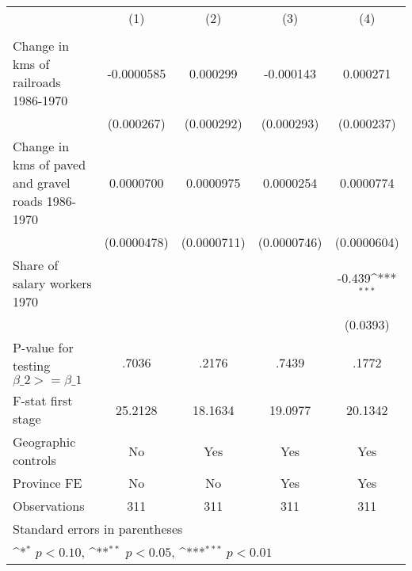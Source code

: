 {
\def\sym#1{\ifmmode^{#1}\else\(^{#1}\)\fi}
\begin{tabular}{l*{4}{c}}
\hline\hline
                &\multicolumn{1}{c}{(1)}&\multicolumn{1}{c}{(2)}&\multicolumn{1}{c}{(3)}&\multicolumn{1}{c}{(4)}\\
                &\multicolumn{1}{c}{}&\multicolumn{1}{c}{}&\multicolumn{1}{c}{}&\multicolumn{1}{c}{}\\
\hline
Change in kms of railroads 1986-1970&-0.0000585         & 0.000299         &-0.000143         & 0.000271         \\
                &(0.000267)         &(0.000292)         &(0.000293)         &(0.000237)         \\
[1em]
Change in kms of paved and gravel roads 1986-1970&0.0000700         &0.0000975         &0.0000254         &0.0000774         \\
                &(0.0000478)         &(0.0000711)         &(0.0000746)         &(0.0000604)         \\
[1em]
Share of salary workers 1970&                  &                  &                  &   -0.439\sym{***}\\
                &                  &                  &                  & (0.0393)         \\
\hline
P-value for testing $\beta\_{2} >= \beta\_{1}$&    .7036         &    .2176         &    .7439         &    .1772         \\
F-stat first stage&  25.2128         &  18.1634         &  19.0977         &  20.1342         \\
Geographic controls&       No         &      Yes         &      Yes         &      Yes         \\
Province FE     &       No         &       No         &      Yes         &      Yes         \\
Observations    &      311         &      311         &      311         &      311         \\
\hline\hline
\multicolumn{5}{l}{\footnotesize Standard errors in parentheses}\\
\multicolumn{5}{l}{\footnotesize \sym{*} \(p<0.10\), \sym{**} \(p<0.05\), \sym{***} \(p<0.01\)}\\
\end{tabular}
}
